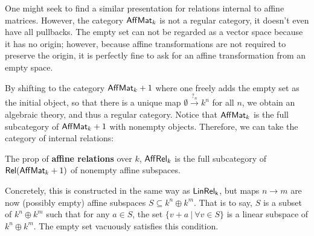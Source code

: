 One might seek to find a similar presentation for relations internal to affine matrices.
However, the category $\mathsf{Aff}\mathsf{Mat}_k$ is not a regular category, it doesn't even have all pullbacks.
The empty set can not be regarded as a vector space because it has no origin; however, because affine transformations are not required to preserve the origin, it is perfectly fine to ask for an affine transformation from an empty space.


By shifting to the category $\mathsf{Aff}\mathsf{Mat}_k+1$ where one freely adds the empty set as the initial object, so that there is a unique map $\emptyset \xrightarrow{?_n} k^n$ for all $n$,  we obtain an algebraic theory, and thus a regular category.  Notice that $\mathsf{Aff}\mathsf{Mat}_k$ is the full subcategory of $\mathsf{Aff}\mathsf{Mat}_k+1$ with nonempty objects.  Therefore, we can take the category of internal relations:
\begin{definition}
The prop of {\bf affine relations} over $k$, $\mathsf{Aff}\mathsf{Rel}_{k}$ is the full subcategory of  $\mathsf{Rel}(\mathsf{Aff}\mathsf{Mat}_k+1)$ of nonempty affine subspaces.
\end{definition}
Concretely, this is constructed in the same way as $\sf LinRel_k$, but maps $n\to m$ are now (possibly empty) affine subspaces $S \subseteq k^n\oplus k^m$. That is to say, $S$ is a subset of $k^n\oplus k^m$ such that for any $a \in S$, the set $\{v+a\ |\ \forall v \in S\}$ is a linear subspace of  $k^n\oplus k^m$.  The empty set vacuously satisfies this condition.


